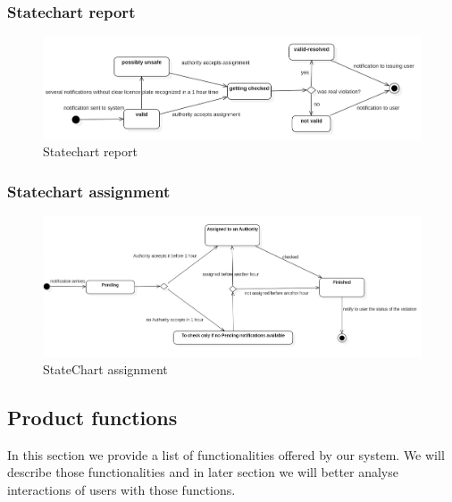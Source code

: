 \subsubsection{Statechart report}
\begin{figure}[h]
\centering
\includegraphics[width=\textwidth]{Images/statechartreport.png}
\caption{\label{fig:sc1} Statechart report}
\end{figure}
\subsubsection{Statechart assignment}
\begin{figure}[h]
\centering
\includegraphics[width=\textwidth]{Images/statechartassignment.png}
\caption{\label{fig:sc2} StateChart assignment}
\end{figure}



\subsection{Product functions}
In this section we provide a list of functionalities offered by our system. We will describe those functionalities and in later section we will better analyse interactions of users with those functions.

